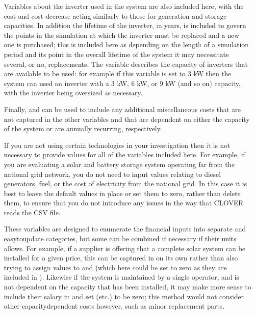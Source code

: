 \documentclass[letterpaper,10pt,english]{sphinxmanual}
\begin{document}
\sphinxAtStartPar
Variables about the inverter used in the system are also included here,
with the cost and cost decrease acting similarly to those for generation
and storage capacities. In addition the lifetime of the inverter, in
years, is included to govern the points in the simulation at which the
inverter must be replaced and a new one is purchased; this is included
here as depending on the length of a simulation period and its point in
the overall lifetime of the system it may necessitate several, or no,
replacements. The  variable describes the
capacity of inverters that are available to be used: for example if this
variable is set to 3 kW then the system can used an inverter with a 3
kW, 6 kW, or 9 kW (and so on) capacity, with the inverter being
oversized as necessary.

\sphinxAtStartPar
Finally,  and  can be used to include any
additional miscellaneous costs that are not captured in the other
variables and that are dependent on either the capacity of the system or
are annually recurring, respectively.

\sphinxAtStartPar
If you are not using certain technologies in your investigation then it
is not necessary to provide values for all of the variables included
here. For example, if you are evaluating a solar and battery storage
system operating far from the national grid network, you do not need to
input values relating to diesel generators, fuel, or the cost of
electricity from the national grid. In this case it is best to leave the
default values in place or set them to zero, rather than delete them, to
ensure that you do not introduce any issues in the way that CLOVER reads
the CSV file.

\sphinxAtStartPar
These variables are designed to enumerate the financial inputs into
separate and easy\sphinxhyphen{}to\sphinxhyphen{}update categories, but some can be combined if
necessary if their units allows. For example, if a supplier is offering
that a complete solar system can be installed for a given price, this
can be captured in  on its own rather than also trying to
assign values to  and  (which here
could be set to zero as they are included in ). Likewise if
the system is maintained by a single operator, and is not dependent on
the capacity that has been installed, it may make more sense to include
their salary in  and set  (etc.) to be zero;
this method would not consider other capacity\sphinxhyphen{}dependent costs however,
such as minor replacement parts.
\end{document}
